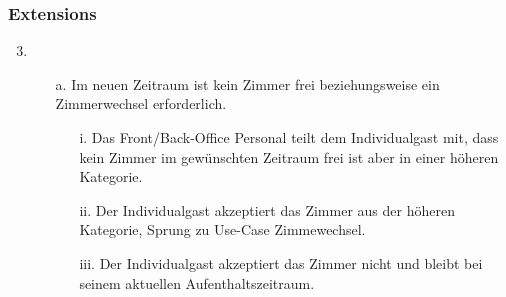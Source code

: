 \documentclass[./detailed_overview_usecases.tex]{subfiles}
\begin{document}
    \subsubsection*{Extensions}
    \begin{enumerate}
        \setcounter{enumi}{2}
		\item
        \begin{itemize}
            \item[a.] Im neuen Zeitraum ist kein Zimmer frei beziehungsweise ein Zimmerwechsel erforderlich.
                \begin{itemize}
                               \item[i.] Das Front/Back-Office Personal teilt dem Individualgast mit, dass kein Zimmer im gewünschten Zeitraum frei ist aber in einer höheren Kategorie.
                               \item[ii.] Der Individualgast akzeptiert das Zimmer aus der höheren Kategorie, Sprung zu Use-Case Zimmewechsel.
                               \item[iii.] Der Individualgast akzeptiert das Zimmer nicht und bleibt bei seinem aktuellen Aufenthaltszeitraum.
                \end{itemize}
        \end{itemize}
    \end{enumerate}
\end{document}
